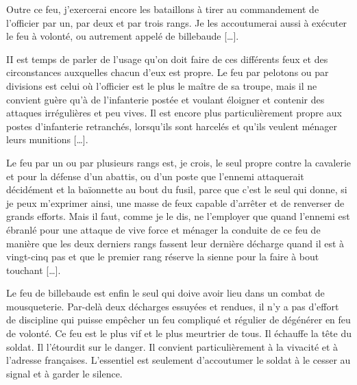 \documentclass[french,twoside]{book} %
\begin{document}
Outre ce feu, j’exercerai encore les bataillons à tirer au commandement de l’officier par un, par deux et par trois rangs. Je les accoutumerai aussi à exécuter le feu à volonté, ou autrement appelé de billebaude […].\par
II est temps de parler de l’usage qu’on doit faire de ces différents feux et des circonstances auxquelles chacun d’eux est propre. Le feu par pelotons ou par divisions est celui où l’officier est le plus le maître de sa troupe, mais il ne convient guère qu’à de l’infanterie postée et voulant éloigner et contenir des attaques irrégulières et peu vives. Il est encore plus particulièrement propre aux postes d’infanterie retranchés, lorsqu’ils sont harcelés et qu’ils veulent ménager leurs munitions […].\par
Le feu par un ou par plusieurs rangs est, je crois, le seul propre contre la cavalerie et pour la défense d’un abattis, ou d’un poste que l’ennemi attaquerait décidément et la baïonnette au bout du fusil, parce que c’est le seul qui donne, si je peux m’exprimer ainsi, une masse de feux capable d’arrêter et de renverser de grands efforts. Mais il faut, comme je le dis, ne l’employer que quand l’ennemi est ébranlé pour une attaque de vive force et ménager la conduite de ce feu de manière que les deux derniers rangs fassent leur dernière décharge quand il est à vingt-cinq pas et que le premier rang réserve la sienne pour la faire à bout touchant […].\par
Le feu de billebaude est enfin le seul qui doive avoir lieu dans un combat de mousqueterie. Par-delà deux décharges essuyées et rendues, il n’y a pas d’effort de discipline qui puisse empêcher un feu compliqué et régulier de dégénérer en feu de volonté. Ce feu est le plus vif et le plus meurtrier de tous. Il échauffe la tête du soldat. Il l’étourdit sur le danger. Il convient particulièrement à la vivacité et à l’adresse françaises. L’essentiel est seulement d’accoutumer le soldat à le cesser au signal et à garder le silence.
\end{document}

